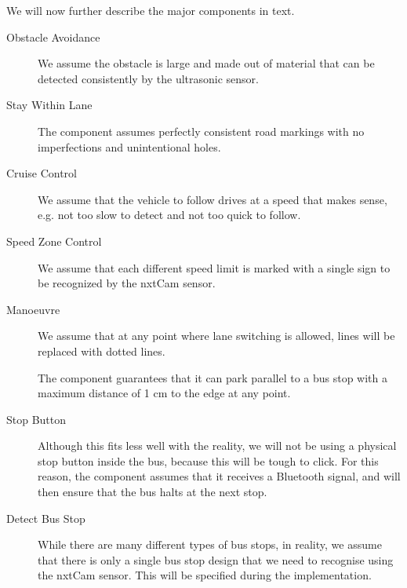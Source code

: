We will now further describe the major components in text.
\begin{description}
    
    \item[Obstacle Avoidance]
    We assume the obstacle is large and made out of material that can be detected consistently by the ultrasonic sensor. 
    
    \item[Stay Within Lane]
    The component assumes perfectly consistent road markings with no imperfections and unintentional holes. 
    
    \item[Cruise Control]
    We assume that the vehicle to follow drives at a speed that makes sense, e.g. not too slow to detect and not too quick to follow. 
    
    \item[Speed Zone Control]
    We assume that each different speed limit is marked with a single sign to be recognized by the nxtCam sensor. 
    
    \item[Manoeuvre]
    We assume that at any point where lane switching is allowed, lines will be replaced with dotted lines. 
    
    The component guarantees that it can park parallel to a bus stop with a maximum distance of 1 cm to the edge at any point. 

    \item[Stop Button]
    Although this fits less well with the reality, we will not be using a physical stop button inside the bus, because this will be tough to click. For this reason, the component assumes that it receives a Bluetooth signal, and will then ensure that the bus halts at the next stop.  
    
    \item[Detect Bus Stop]
    While there are many different types of bus stops, in reality, we assume that there is only a single bus stop design that we need to recognise using the nxtCam sensor. This will be specified during the implementation.
    
    
\end{description}